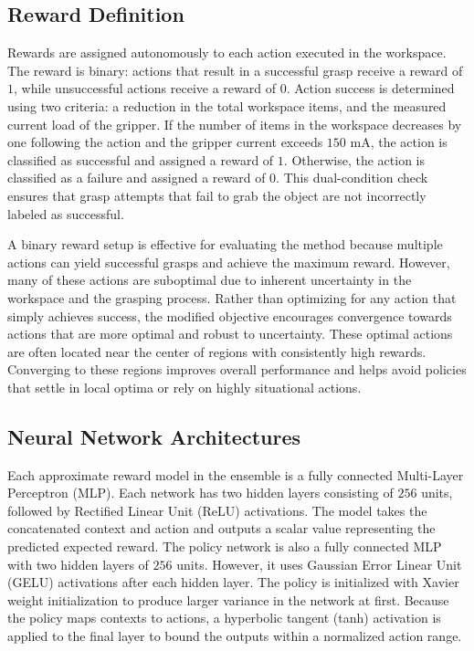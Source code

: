 \documentclass[./dissertation.tex]{subfiles}
\begin{document}
\subsection{Reward Definition}
Rewards are assigned autonomously to each action executed in the workspace. The reward is binary: actions that result in a successful grasp receive a reward of $1$, while unsuccessful actions receive a reward of $0$. Action success is determined using two criteria: a reduction in the total workspace items, and the measured current load of the gripper. If the number of items in the workspace decreases by one following the action and the gripper current exceeds $150$ mA, the action is classified as successful and assigned a reward of $1$. Otherwise, the action is classified as a failure and assigned a reward of $0$. This dual-condition check ensures that grasp attempts that fail to grab the object are not incorrectly labeled as successful.

A binary reward setup is effective for evaluating the method because multiple actions can yield successful grasps and achieve the maximum reward. However, many of these actions are suboptimal due to inherent uncertainty in the workspace and the grasping process. Rather than optimizing for any action that simply achieves success, the modified objective encourages convergence towards actions that are more optimal and robust to uncertainty. These optimal actions are often located near the center of regions with consistently high rewards. Converging to these regions improves overall performance and helps avoid policies that settle in local optima or rely on highly situational actions.

\subsection{Neural Network Architectures}
\label{sec:nn_arc}
Each approximate reward model in the ensemble is a fully connected Multi-Layer Perceptron (MLP). Each network has two hidden layers consisting of $256$ units, followed by Rectified Linear Unit (ReLU) activations. The model takes the concatenated context and action and outputs a scalar value representing the predicted expected reward. The policy network is also a fully connected MLP with two hidden layers of $256$ units. However, it uses Gaussian Error Linear Unit (GELU) activations after each hidden layer. The policy is initialized with Xavier weight initialization to produce larger variance in the network at first. Because the policy maps contexts to actions, a hyperbolic tangent (tanh) activation is applied to the final layer to bound the outputs within a normalized action range.
\end{document}
